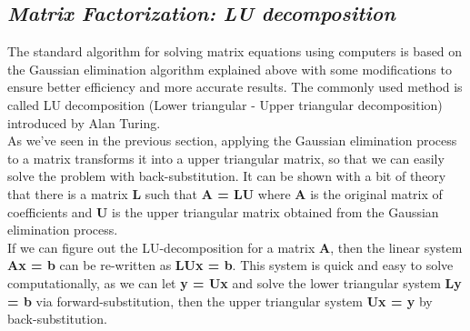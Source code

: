 \documentclass[11pt,a4paper,oneside]{report}
\begin{document}
{\center\color{magenta}
\subsection*{\it\huge Matrix Factorization: LU decomposition}}
The standard algorithm for solving matrix equations using computers is based on the Gaussian elimination algorithm explained above with some modifications to ensure better efficiency and more accurate results. The commonly used method is called LU decomposition (Lower triangular - Upper triangular decomposition) introduced by Alan Turing.\\

As we've seen in the previous section, applying the Gaussian elimination process to a matrix transforms it into a upper triangular matrix, so that we can easily solve the problem with back-substitution. It can be shown with a bit of theory that there is a matrix {\bf L} such that {\bf A = LU} where {\bf A} is the original matrix of coefficients and {\bf U} is the upper triangular matrix obtained from the Gaussian elimination process.\\

If we can figure out the LU-decomposition for a matrix {\bf A}, then the linear system {\bf Ax = b} can be re-written as {\bf LUx = b}. This system is quick and easy to solve computationally, as we can let {\bf y = Ux} and solve the lower triangular system {\bf Ly = b} via forward-substitution, then the upper triangular system {\bf Ux = y} by back-substitution.
\end{document}
